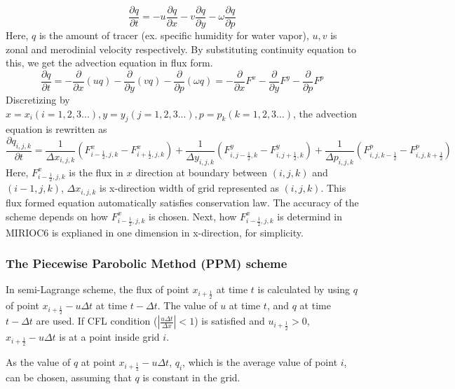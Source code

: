 \begin{equation}
\frac{\partial q}{\partial t} = -u \frac{\partial q}{\partial x}-v \frac{\partial q}{\partial y}-\omega \frac{\partial q}{\partial p}
\end{equation}
Here, $q$ is the amount of tracer (ex. specific humidity for water vapor), $u,v$ is zonal and merodinial velocity respectively.
By substituting continuity equation to this, we get the advection equation in flux form.
\begin{equation}
  \frac{\partial q}{\partial t}=-\frac{\partial}{\partial x}(uq)-\frac{\partial}{\partial y}(vq)-\frac{\partial}{\partial p}(\omega q)
  =-\frac{\partial}{\partial x}F^{x}-\frac{\partial}{\partial y}F^{y}-\frac{\partial}{\partial p}F^{p}
\end{equation}
Discretizing by $x=x_{i} (i=1,2,3...), y=y_{j} (j=1,2,3...), p=p_{k} (k=1,2,3...)$, the advection equation is rewritten as
\begin{equation}
  \frac{\partial q_{i,j,k}}{\partial t}=\frac{1}{\Delta x_{i,j,k}}(F^{x}_{i-\frac{1}{2},j,k}-F^{x}_{i+\frac{1}{2},j,k})+\frac{1}{\Delta y_{i,j,k}}(F^{y}_{i,j-\frac{1}{2},k}-F^{y}_{i,j+\frac{1}{2},k})+\frac{1}{\Delta p_{i,j,k}}(F^{p}_{i,j,k-\frac{1}{2}}-F^{p}_{i,j,k+\frac{1}{2}})
\end{equation}
Here, $F^{x}_{i-\frac{1}{2},j,k}$ is the flux in $x$ direction at boundary between $(i,j,k)$ and $(i-1,j,k)$, $\Delta x_{i,j,k}$ is x-direction width of grid represented as $(i,j,k)$.
This flux formed equation automatically satisfies conservation law. 
The accuracy of the scheme depends on how $F^{x}_{i-\frac{1}{2},j,k}$ is chosen.
Next, how $F^{x}_{i-\frac{1}{2},j,k}$ is determind in MIRIOC6 is explianed in one dimension in x-direction, for simplicity. 
\subsubsection{The Piecewise Parobolic Method (PPM) scheme}
In semi-Lagrange scheme, the flux of point $x_{i+\frac{1}{2}}$ at time $t$ is calculated by using $q$ of point $x_{i+\frac{1}{2}}-u\Delta t$ at time $t-\Delta t$.
The value of $u$ at time $t$, and $q$ at time $t-\Delta t$ are used.
If CFL condition ($|\frac{u\Delta t}{\Delta x}|<1$) is satisfied and $u_{i+\frac{1}{2}}>0$, $x_{i+\frac{1}{2}}-u\Delta t$ is at a point inside grid $i$.

As the value of $q$ at point $x_{i+\frac{1}{2}}-u\Delta t$, $q_{i}$, which is the average value of point $i$, can be chosen, assuming that $q$ is constant in the grid. 

